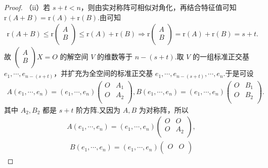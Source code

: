 \documentclass[../../main.tex]{subfiles}
\begin{document}
\begin{proof}
（ii）若 $s+t<n$，则由实对称阵可相似对角化，再结合特征值可知 $\mathrm{r}\left( A+B \right) =\mathrm{r}\left( A \right) +\mathrm{r}\left( B \right) $.由可知
\begin{align*}
\mathrm{r}\left( A+B \right) \leqslant \mathrm{r}\begin{pmatrix}
A\\
B\\
\end{pmatrix} \leqslant \mathrm{r}\left( A \right) +\mathrm{r}\left( B \right) \Longrightarrow \mathrm{r}\begin{pmatrix}
A\\
B\\
\end{pmatrix} =\mathrm{r}\left( A \right) +\mathrm{r}\left( B \right) =s+t.
\end{align*}
故 $\begin{pmatrix}
A\\
B\\
\end{pmatrix} X=O$ 的解空间 $V$ 的维数等于 $n-\left( s+t \right) $.取 $V$ 的一组标准正交基 $e_1,\cdots ,e_{n-\left( s+t \right)}$，并扩充为全空间的标准正交基 $e_1,\cdots ,e_{n-\left( s+t \right)},\cdots ,e_n$.于是可设
\begin{align*}
A\left( e_1,\cdots ,e_n \right) =\left( e_1,\cdots ,e_n \right) \begin{pmatrix}
O&		A_1\\
O&		A_2\\
\end{pmatrix},B\left( e_1,\cdots ,e_n \right) =\left( e_1,\cdots ,e_n \right) \begin{pmatrix}
O&		B_1\\
O&		B_2\\
\end{pmatrix}.
\end{align*}
其中 $A_2,B_2$ 都是 $s+t$ 阶方阵.又因为 $A,B$ 为对称阵，所以
\begin{align*}
A\left( e_1,\cdots ,e_n \right) =\left( e_1,\cdots ,e_n \right) \begin{pmatrix}
O&		O\\
O&		A_2\\
\end{pmatrix},
\end{align*}
\begin{align*}
B\left( e_1,\cdots ,e_n \right) =\left( e_1,\cdots ,e_n \right) \begin{pmatrix}
O&		O\\

\end{pmatrix}
\end{align*}
\end{proof}
\end{document}
